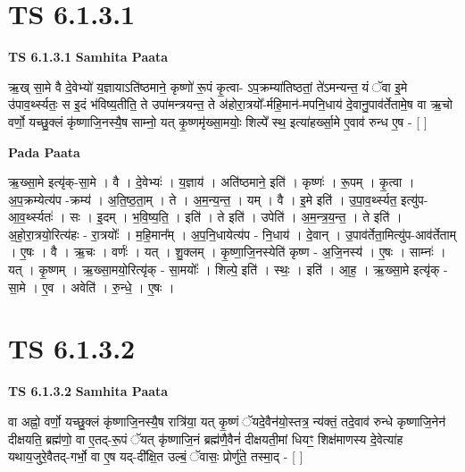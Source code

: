 \documentclass[17pt]{extarticle}
\begin{document}

\section{ TS 6.1.3.1 }

\textbf{TS 6.1.3.1 } \newline
\textbf{Samhita Paata} \newline

ऋ॒ख् सा॒मे वै दे॒वेभ्यो॑ य॒ज्ञायाऽति॑ष्ठमाने॒ कृष्णो॑ रू॒पं कृ॒त्वा- ऽप॒क्रम्या॑तिष्ठतां॒ ते॑ऽमन्यन्त॒ यं ॅवा इ॒मे उ॑पाव॒र्थ्स्यतः॒ स इ॒दं भ॑विष्य॒तीति॒ ते उपा॑मन्त्रयन्त॒ ते अ॑होरा॒त्रयो᳚-र्महि॒मान॑-मपनि॒धाय॑ दे॒वानु॒पाव॑र्तेतामे॒ष वा ऋ॒चो वर्णो॒ यच्छु॒क्लं कृ॑ष्णाजि॒नस्यै॒ष साम्नो॒ यत् कृ॒ष्णमृ॑ख्सा॒मयोः॒ शिल्पे᳚ स्थ॒ इत्या॑हर्ख्सा॒मे ए॒वाव॑ रुन्ध ए॒ष - [  ] \newline

\textbf{Pada Paata} \newline

ऋ॒ख्सा॒मे इत्यृ॑क्-सा॒मे । वै । दे॒वेभ्यः॑ । य॒ज्ञाय॑ । अति॑ष्ठमाने॒ इति॑ । कृष्णः॑ । रू॒पम् । कृ॒त्वा । अ॒प॒क्रम्येत्य॑प -क्रम्य॑ । अ॒ति॒ष्ठ॒ता॒म् । ते । अ॒म॒न्य॒न्त॒ । यम् । वै । इ॒मे इति॑ । उ॒पा॒व॒र्थ्स्यत॒ इत्यु॑प-आ॒व॒र्थ्स्यतः॑ । सः । इ॒दम् । भ॒वि॒ष्य॒ति॒ । इति॑ । ते इति॑ । उपेति॑ । अ॒म॒न्त्र॒य॒न्त॒ । ते इति॑ । अ॒हो॒रा॒त्रयो॒रित्य॑हः - रा॒त्रयोः᳚ । म॒हि॒मान᳚म् । अ॒प॒नि॒धायेत्य॑प - नि॒धाय॑ । दे॒वान् । उ॒पाव॑र्तेता॒मित्यु॑प-आव॑र्तेताम् । ए॒षः । वै । ऋ॒चः । वर्णः॑ । यत् । शु॒क्लम् । कृ॒ष्णा॒जि॒नस्येति॑ कृष्ण - अ॒जि॒नस्य॑ । ए॒षः । साम्नः॑ । यत् । कृ॒ष्णम् । ऋ॒ख्सा॒मयो॒रित्यृ॑क् - सा॒मयोः᳚ । शिल्पे॒ इति॑ । स्थः॒ । इति॑ । आ॒ह॒ । ऋ॒ख्सा॒मे इत्यृ॑क् - सा॒मे । ए॒व । अवेति॑ । रु॒न्धे॒ । ए॒षः ।  \newline





\section{ TS 6.1.3.2 }

\textbf{TS 6.1.3.2 } \newline
\textbf{Samhita Paata} \newline

वा अह्नो॒ वर्णो॒ यच्छु॒क्लं कृ॑ष्णाजि॒नस्यै॒ष रात्रि॑या॒ यत् कृ॒ष्णं ॅयदे॒वैन॑यो॒स्तत्र॒ न्य॑क्तं॒ तदे॒वाव॑ रुन्धे कृष्णाजि॒नेन॑ दीक्षयति॒ ब्रह्म॑णो॒ वा ए॒तद्-रू॒पं ॅयत् कृ॑ष्णाजि॒नं ब्रह्म॑णै॒वैनं॑ दीक्षयती॒मां धियꣳ॒॒ शिक्ष॑माणस्य दे॒वेत्या॑ह यथाय॒जुरे॒वैतद्-गर्भो॒ वा ए॒ष यद्-दी᳚क्षि॒त उल्बं॒ ॅवासः॒ प्रोर्णु॑ते॒ तस्मा॒द् - [  ] \newline
\end{document}
